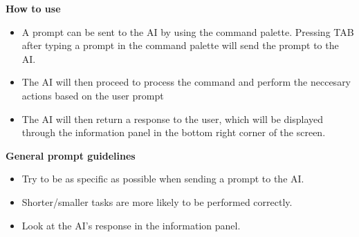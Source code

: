 \documentclass[11pt,a4paper]{article}
\begin{document}
\textbf{How to use}

\begin{itemize}
  \item[\textbullet] A prompt can be sent to the AI by using the command palette. Pressing TAB after typing a prompt in the command palette will send the prompt to the AI.
  \item[\textbullet] The AI will then proceed to process the command and perform the neccesary actions based on the user prompt
  \item[\textbullet] The AI will then return a response to the user, which will be displayed through the information panel in the bottom right corner of the screen.
\end{itemize}


\textbf{General prompt guidelines}

\begin{itemize}
  \item[\textbullet] Try to be as specific as possible when sending a prompt to the AI.
  \item[\textbullet] Shorter/smaller tasks are more likely to be performed correctly.
  \item[\textbullet] Look at the AI's response in the information panel.
\end{itemize}
 
\end{document}
